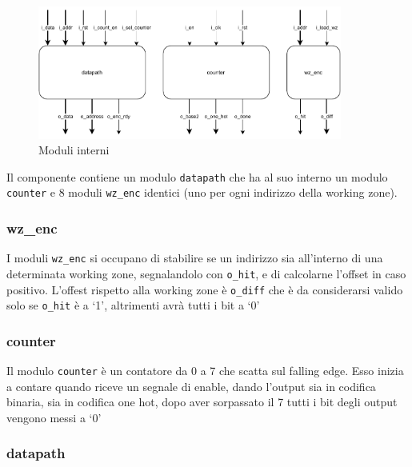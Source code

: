 \documentclass[a4paper]{article}
\begin{document}
\begin{figure}[H]
  \centering
  \includegraphics[width=10cm]{schema-components.pdf}
  \caption{Moduli interni}
  \label{fig:modules}
\end{figure}

Il componente contiene un modulo \texttt{datapath} che ha al suo interno un modulo \texttt{counter} e 8 moduli \texttt{wz\_enc} identici (uno per ogni indirizzo della working zone).

\subsubsection{wz\_enc}

I moduli \texttt{wz\_enc} si occupano di stabilire se un indirizzo sia all'interno di una determinata working zone, segnalandolo con \texttt{o\_hit}, e di calcolarne l'offset in caso positivo. L'offest rispetto alla working zone è \texttt{o\_diff} che è da considerarsi valido solo se \texttt{o\_hit} è a `1', altrimenti avrà tutti i bit a `0'

\subsubsection{counter}

Il modulo \texttt{counter} è un contatore da 0 a 7 che scatta sul falling edge. Esso inizia a contare quando riceve un segnale di enable, dando l'output sia in codifica binaria, sia in codifica one hot, dopo aver sorpassato il 7 tutti i bit degli output vengono messi a `0'

\subsubsection{datapath}
\end{document}
